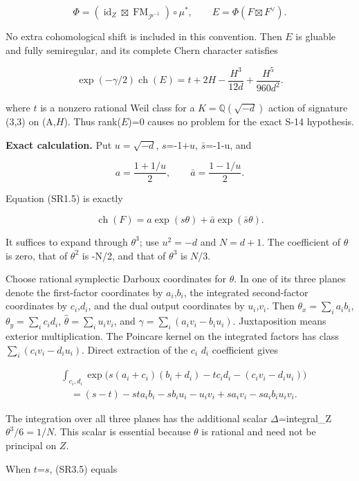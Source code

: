 \[
\Phi=(\operatorname{id}_Z\boxtimes\operatorname{FM}_{\mathcal P^{-1}})\circ\mu^*,\qquad E=\Phi(F\boxtimes F^\vee).\tag{SR3.2}
\]

No extra cohomological shift is included in this convention. Then \(E\) is gluable and fully semiregular, and its complete Chern character satisfies

\[
\exp(-\gamma/2)\operatorname{ch}(E)=t+2H-\frac{H^3}{12d}+\frac{H^5}{960d^2}.\tag{SR3.3}
\]

where \(t\) is a nonzero rational Weil class for a \(K=\mathbb Q(\sqrt{-d})\) action of signature (3,3) on (A,\(H\)). Thus rank(\(E\))=0 causes no problem for the exact S-14 hypothesis.

\textbf{Exact calculation.} Put \(u=\sqrt{-d}\), \(s\)=-1+\(u\), \(\bar s\)=-1-u, and

\[
a=\frac{1+1/u}{2},\qquad\bar a=\frac{1-1/u}{2}.
\]

Equation (SR1.5) is exactly

\[
\operatorname{ch}(F)=a\exp(s\theta)+\bar a\exp(\bar s\theta).\tag{SR3.4}
\]

It suffices to expand through \(\theta^3\); use \(u^2=-d\) and \(N=d+1\). The coefficient of \(\theta\) is zero, that of \(\theta^2\) is -N/2, and that of \(\theta^3\) is \(N\)/3.

Choose rational symplectic Darboux coordinates for \(\theta\). In one of its three planes denote the first-factor coordinates by \(a_i\),\(b_i\), the integrated second-factor coordinates by \(c_i\),\(d_i\), and the dual output coordinates by \(u_i\),\(v_i\). Then \(\theta_x=\sum_i a_i b_i\), \(\theta_y=\sum_i c_i d_i\), \(\widehat\theta=\sum_i u_i v_i\), and \(\gamma=\sum_i(a_i v_i-b_i u_i)\). Juxtaposition means exterior multiplication. The Poincare kernel on the integrated factors has class \(\sum_i(c_i v_i-d_i u_i)\). Direct extraction of the \(c_i\) \(d_i\) coefficient gives

\[
\begin{aligned}&\int_{c_i,d_i}\exp\bigl(s(a_i+c_i)(b_i+d_i)-t c_i d_i-(c_i v_i-d_i u_i)\bigr)\\&\quad=(s-t)-st a_i b_i-s b_i u_i-u_i v_i+s a_i v_i-s a_i b_i u_i v_i.\end{aligned}\tag{SR3.5}
\]

The integration over all three planes has the additional scalar \(\Delta\)=integral\_Z \(\theta^3/6=1/N\). This scalar is essential because \(\theta\) is rational and need not be principal on \(Z\).

When \(t\)=\(s\), (SR3.5) equals

